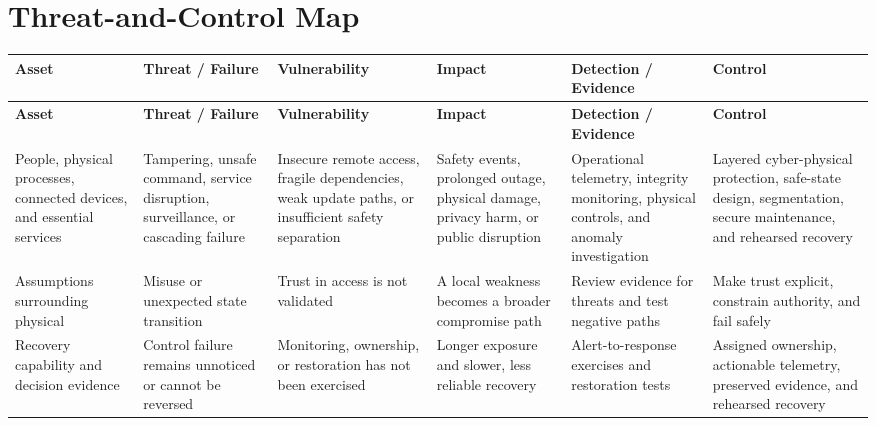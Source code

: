 \documentclass[11pt,letterpaper]{article}
\begin{document}
\section*{Threat-and-Control Map}
\begingroup\scriptsize\setlength{\tabcolsep}{2pt}
\begin{longtable}{>{\raggedright\arraybackslash}p{}>{\raggedright\arraybackslash}p{}>{\raggedright\arraybackslash}p{}>{\raggedright\arraybackslash}p{}>{\raggedright\arraybackslash}p{}>{\raggedright\arraybackslash}p{}}
\toprule\rowcolor{Navy}\color{white}\textbf{Asset} & \color{white}\textbf{Threat / Failure} & \color{white}\textbf{Vulnerability} & \color{white}\textbf{Impact} & \color{white}\textbf{Detection / Evidence} & \color{white}\textbf{Control}\\\midrule
\endfirsthead
\toprule\rowcolor{Navy}\color{white}\textbf{Asset} & \color{white}\textbf{Threat / Failure} & \color{white}\textbf{Vulnerability} & \color{white}\textbf{Impact} & \color{white}\textbf{Detection / Evidence} & \color{white}\textbf{Control}\\\midrule
\endhead
People, physical processes, connected devices, and essential services & Tampering, unsafe command, service disruption, surveillance, or cascading failure & Insecure remote access, fragile dependencies, weak update paths, or insufficient safety separation & Safety events, prolonged outage, physical damage, privacy harm, or public disruption & Operational telemetry, integrity monitoring, physical controls, and anomaly investigation & Layered cyber-physical protection, safe-state design, segmentation, secure maintenance, and rehearsed recovery\\\midrule
Assumptions surrounding physical & Misuse or unexpected state transition & Trust in access is not validated & A local weakness becomes a broader compromise path & Review evidence for threats and test negative paths & Make trust explicit, constrain authority, and fail safely\\\midrule
Recovery capability and decision evidence & Control failure remains unnoticed or cannot be reversed & Monitoring, ownership, or restoration has not been exercised & Longer exposure and slower, less reliable recovery & Alert-to-response exercises and restoration tests & Assigned ownership, actionable telemetry, preserved evidence, and rehearsed recovery\\\midrule
\bottomrule
\end{longtable}
\endgroup
\end{document}
